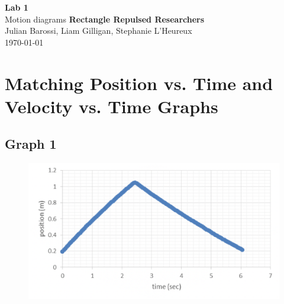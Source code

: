 \documentclass[11pt, letterpaper, includehead]{article}
\begin{document}
  \begin{titlepage} 
    \begin{center}
      \Huge{\textbf{Lab 1}}\\
      \Huge{Motion diagrams}
      \vfill
      \large{\textbf{Rectangle Repulsed Researchers}}\\
      \large{Julian Barossi, Liam Gilligan, Stephanie L'Heureux}\\
      \vspace{0.5cm}
      \normalsize
      \today
    \end{center}
  \end{titlepage}

  \tableofcontents
  \pagebreak %


  \pagestyle{fancy}
  \fancyhead{}

  
  \setcounter{section}{2} %
  \section{Matching Position vs. Time and Velocity vs. Time Graphs}

  \subsection{Graph 1}

  \begin{figure}[H] %
    \centering 
    \includegraphics[width=\linewidth]{graph_1.png}
  \end{figure}
\end{document}
